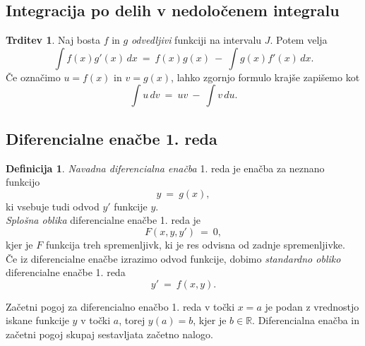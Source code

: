 \documentclass[11pt]{article}
\theoremstyle{definition}
\newtheorem{definicija}{Definicija}[section]
\theoremstyle{definition}
\newtheorem{trditev}{Trditev}[section]
\theoremstyle{definition}
\theoremstyle{theorem}
\begin{document}
\subsection{Integracija po delih v nedoločenem integralu}
\vspace{0.5cm}

\begin{trditev}

Naj bosta $f$ in $g$ \textit{odvedljivi} funkciji na intervalu $J$. Potem velja
$$\int f(x) g'(x)\,dx ~=~ f(x) g(x) ~-~ \int g(x) f'(x)\,dx.$$
Če označimo $u = f(x)$ in $v = g(x)$, lahko zgornjo formulo krajše zapišemo kot
$$\int u\,dv ~=~ uv ~-~ \int v\,du.$$

\end{trditev}
\vspace{0.5cm}

\pagebreak


\subsection{Diferencialne enačbe 1. reda}
\vspace{0.5cm}

\begin{definicija}

\textit{Navadna diferencialna enačba} 1. reda je enačba za neznano funkcijo 
$$y~=~g(x),$$
ki vsebuje tudi odvod $y'$ funkcije $y$. \\

\noindent \textit{Splošna oblika} diferencialne enačbe 1. reda je
$$F(x,y,y')~=~0,$$
kjer je $F$ funkcija treh spremenljivk, ki je res odvisna od zadnje spremenljivke. \\

\noindent Če iz diferencialne enačbe izrazimo odvod funkcije, dobimo \textit{standardno obliko} diferencialne enačbe 1. reda
$$y' ~=~ f(x,y).$$

\noindent Začetni pogoj za diferencialno enačbo 1. reda v točki $x = a$ je podan z vrednostjo iskane funkcije $y$ v točki $a$, torej $y(a) = b$, kjer je $b \in \mathbb{R}$. Diferencialna enačba in začetni pogoj skupaj sestavljata začetno nalogo.

\end{definicija}
\vspace{0.5cm}
\end{document}
